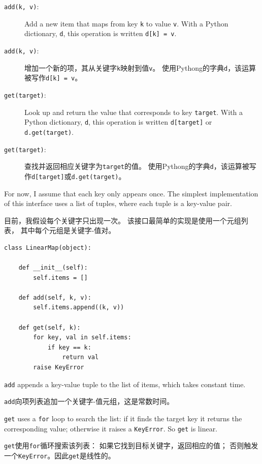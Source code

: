 \documentclass[10pt]{book}
\begin{document}
\begin{CJK}{UTF8}{gbsn}
\begin{description}
\item[{\tt add(k, v)}:] Add a new item that maps from key {\tt k}
to value {\tt v}.  With a Python dictionary, {\tt d}, this operation
is written {\tt d[k] = v}.

\item[{\tt add(k, v)}:] 增加一个新的项，其从关键字{\tt k}映射到值{\tt v}。
使用Pythong的字典{\tt d}，该运算被写作{\tt d[k] = v}。

\item[{\tt get(target)}:] Look up and return the value that corresponds
to key {\tt target}.  With a Python dictionary, {\tt d}, this operation
is written {\tt d[target]} or {\tt d.get(target)}.

\item[{\tt get(target)}:] 查找并返回相应关键字为{\tt target}的值。
使用Pythong的字典{\tt d}，该运算被写作{\tt d[target]}或{\tt d.get(target)}。

\end{description}

For now, I assume that each key only appears once.
The simplest implementation of this interface uses a list of
tuples, where each tuple is a key-value pair.

目前，我假设每个关键字只出现一次。
该接口最简单的实现是使用一个元组列表，
其中每个元组是关键字-值对。

\begin{verbatim}
class LinearMap(object):

    def __init__(self):
        self.items = []

    def add(self, k, v):
        self.items.append((k, v))

    def get(self, k):
        for key, val in self.items:
            if key == k:
                return val
        raise KeyError
\end{verbatim}

{\tt add} appends a key-value tuple to the list of items, which
takes constant time.

{\tt add}向项列表追加一个关键字-值元组，这是常数时间。

{\tt get} uses a {\tt for} loop to search the list:
if it finds the target key it returns the corresponding value;
otherwise it raises a {\tt KeyError}.
So {\tt get} is linear.

{\tt get}使用{\tt for}循环搜索该列表：
如果它找到目标关键字，返回相应的值；
否则触发一个{\tt KeyError}。因此{\tt get}是线性的。


\end{CJK}
\end{document}
